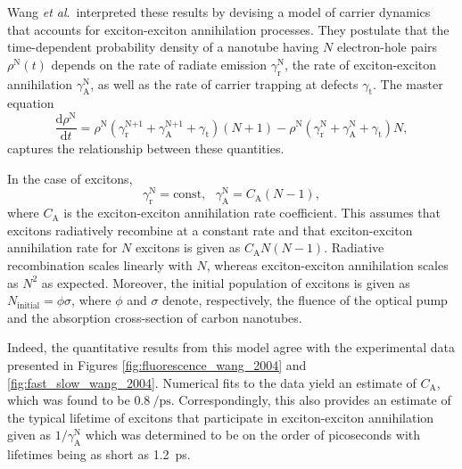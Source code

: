 Wang \textit{et al}.\ interpreted these results by devising a model of carrier dynamics that accounts for exciton-exciton annihilation processes. They postulate that the time-dependent probability density of a nanotube having $N$ electron-hole pairs $\rho^\text{N}(t)$ depends on the rate of radiate emission $\gamma^\text{N}_\text{r}$, the rate of exciton-exciton annihilation $\gamma^\text{N}_\text{A}$, as well as the rate of carrier trapping at defects $\gamma_\text{t}$. The master equation
\begin{equation}
	\dfrac{\mathrm{d}\rho^\text{N}}{\mathrm{d} t} = \rho^\text{N}(\gamma^\text{N+1}_\text{r} + \gamma^\text{N+1}_\text{A} + \gamma_\text{t})(N+1) - \rho^\text{N}(\gamma^\text{N}_\text{r} + \gamma^\text{N}_\text{A} + \gamma_\text{t})N,
\end{equation}
captures the relationship between these quantities.


In the case of excitons,
\begin{equation}
	\gamma^\text{N}_\text{r} = \text{const}, \text{   } \gamma^\text{N}_\text{A} = C_\text{A}(N-1),
\end{equation}
where $C_\text{A}$ is the exciton-exciton annihilation rate coefficient. This assumes that excitons radiatively recombine at a constant rate and that exciton-exciton annihilation rate for $N$ excitons is given as $C_\text{A}N(N-1)$. Radiative recombination scales linearly with $N$, whereas exciton-exciton annihilation scales as $N^2$ as expected. Moreover, the initial population of excitons is given as $N_\text{initial} = \phi \sigma$, where $\phi$ and $\sigma$ denote, respectively, the fluence of the optical pump and the absorption cross-section of carbon nanotubes.


Indeed, the quantitative results from this model agree with the experimental data presented in Figures \ref{fig:fluorescence_wang_2004} and \ref{fig:fast_slow_wang_2004}. Numerical fits to the data yield an estimate of $C_\text{A}$, which was found to be $\SI{0.8}{\per\pico\second}$. Correspondingly, this also provides an estimate of the typical lifetime of excitons that participate in exciton-exciton annihilation given as $1/\gamma^\text{N}_\text{A}$ which was determined to be on the order of picoseconds with lifetimes being as short as \SI{1.2}{\pico \second}.

